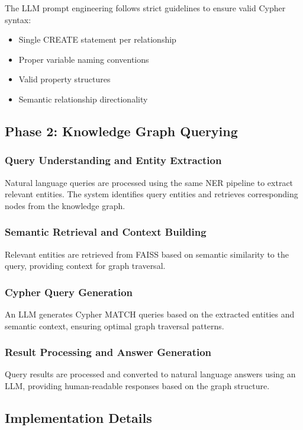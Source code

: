 \documentclass[conference]{IEEEtran}
\begin{document}
The LLM prompt engineering follows strict guidelines to ensure valid Cypher syntax:
\begin{itemize}
\item Single CREATE statement per relationship
\item Proper variable naming conventions
\item Valid property structures
\item Semantic relationship directionality
\end{itemize}

\subsection{Phase 2: Knowledge Graph Querying}

\subsubsection{Query Understanding and Entity Extraction}
Natural language queries are processed using the same NER pipeline to extract relevant entities. The system identifies query entities and retrieves corresponding nodes from the knowledge graph.

\subsubsection{Semantic Retrieval and Context Building}
Relevant entities are retrieved from FAISS based on semantic similarity to the query, providing context for graph traversal.

\subsubsection{Cypher Query Generation}
An LLM generates Cypher MATCH queries based on the extracted entities and semantic context, ensuring optimal graph traversal patterns.

\subsubsection{Result Processing and Answer Generation}
Query results are processed and converted to natural language answers using an LLM, providing human-readable responses based on the graph structure.

\subsection{Implementation Details}
\end{document}

